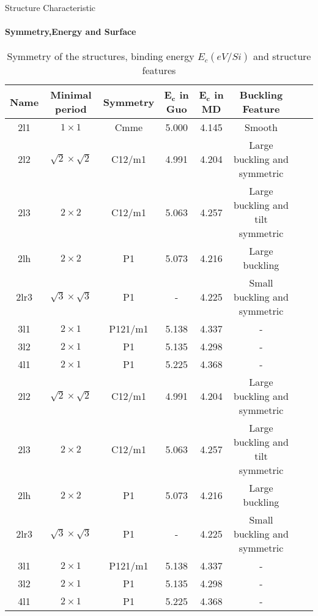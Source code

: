 \documentclass{beamer}
\begin{document}
\begin{frame}{Structure Characteristic}
  \framesubtitle{Symmetry,Energy and Surface}%
  \begin{table}[!b]
    \tiny
    {\carlitoTLF %
      \begin{tabular}{cccccccc}
        \textbf{Name}
             & \textbf{Minimal period}
             & \textbf{Symmetry}
             & \textbf{$\mathbf{E_c}$ in Guo}
             & \textbf{$\mathbf{E_c}$ in MD}
             & \textbf{Buckling Feature}                                                                    \\
        \toprule
        2l1  & $1 \times 1$                   & Cmme    & 5.000 & 4.145 & Smooth                            \\
        2l2  & $\sqrt{2}\times\sqrt{2}$       & C12/m1  & 4.991 & 4.204 & Large buckling and symmetric      \\
        2l3  & $2 \times 2$                   & C12/m1  & 5.063 & 4.257 & Large buckling and tilt symmetric \\
        2lh  & $2 \times 2$                   & P1      & 5.073 & 4.216 & Large buckling                    \\
        2lr3 & $\sqrt{3}\times\sqrt{3}$       & P1      & -     & 4.225 & Small buckling and symmetric      \\
        3l1  & $2 \times 1$                   & P121/m1 & 5.138 & 4.337 & -                                 \\
        3l2  & $2 \times 1$                   & P1      & 5.135 & 4.298 & -                                 \\
        4l1  & $2 \times 1$                   & P1      & 5.225 & 4.368 & -                                 \\
        2l2  & $\sqrt{2}\times\sqrt{2}$       & C12/m1  & 4.991 & 4.204 & Large buckling and symmetric      \\
        2l3  & $2 \times 2$                   & C12/m1  & 5.063 & 4.257 & Large buckling and tilt symmetric \\
        2lh  & $2 \times 2$                   & P1      & 5.073 & 4.216 & Large buckling                    \\
        2lr3 & $\sqrt{3}\times\sqrt{3}$       & P1      & -     & 4.225 & Small buckling and symmetric      \\
        3l1  & $2 \times 1$                   & P121/m1 & 5.138 & 4.337 & -                                 \\
        3l2  & $2 \times 1$                   & P1      & 5.135 & 4.298 & -                                 \\
        4l1  & $2 \times 1$                   & P1      & 5.225 & 4.368 & -                                 \\
        \bottomrule
      \end{tabular}
    }

    \caption{
      Symmetry of the structures, binding energy $E_c(eV/Si)$ and structure features}
  \end{table}

\end{frame}
\end{document}

